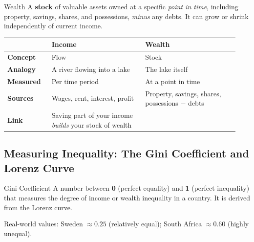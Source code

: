 \documentclass[11pt, a4paper, twoside]{book}
\begin{document}
\begin{keyterm}{Wealth}
A \textbf{stock} of valuable assets owned at a specific \emph{point in time}, including property, savings, shares, and possessions, \emph{minus} any debts. It can grow or shrink independently of current income.
\end{keyterm}

\begin{tcolorbox}[enhanced,colback=LightBlue,colframe=MidBlue!70,arc=0pt,boxrule=0.8pt]
\begin{tabular}{@{}>{\RaggedRight\arraybackslash}p{0.18\linewidth}>{\RaggedRight\arraybackslash}p{0.38\linewidth}>{\RaggedRight\arraybackslash}p{0.38\linewidth}@{}}
& \textbf{\color{NavyPrimary}Income} & \textbf{\color{NavyPrimary}Wealth} \\
\midrule
\textbf{Concept} & Flow & Stock \\
\textbf{Analogy} & A river flowing into a lake & The lake itself \\
\textbf{Measured} & Per time period & At a point in time \\
\textbf{Sources} & Wages, rent, interest, profit & Property, savings, shares, possessions $-$ debts \\
\textbf{Link} & Saving part of your income \emph{builds} your stock of wealth & \\
\end{tabular}
\end{tcolorbox}

\subsection{Measuring Inequality: The Gini Coefficient and Lorenz Curve}

\begin{keyterm}{Gini Coefficient}
A number between \textbf{0} (perfect equality) and \textbf{1} (perfect inequality) that measures the degree of income or wealth inequality in a country. It is derived from the Lorenz curve.
\end{keyterm}

Real-world values: Sweden $\approx 0.25$ (relatively equal); South Africa $\approx 0.60$ (highly unequal).
\end{document}
